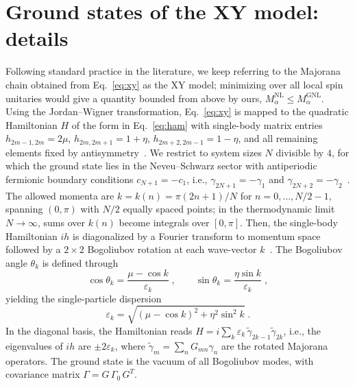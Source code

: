 \documentclass[aps,prl,twocolumn,superscriptaddress,reprint,longbibliography,nofootinbib]{revtex4-2}
\newcommand{\RENYI}{\alpha}
\begin{document}
\section{Ground states of the XY model: details}
\label{app:xy}
Following standard practice in the literature, we keep referring to the Majorana chain obtained from Eq.~\eqref{eq:xy} as the XY model; minimizing over all local spin unitaries would give a quantity bounded from above by ours, $M_\RENYI^{\mathrm{NL}}\le M_\RENYI^{\mathrm{GNL}}$.
Using the Jordan--Wigner transformation, Eq.~\eqref{eq:xy} is mapped to the quadratic Hamiltonian $H$ of the form in Eq.~\eqref{eq:ham} with single-body matrix entries $h_{2m-1,2m} = 2\mu$, $h_{2m,2m+1} = 1+\eta$, $h_{2m+2,2m-1} = 1-\eta$, and all remaining elements fixed by antisymmetry~\cite{Mbeng2024}.
We restrict to system sizes $N$ divisible by $4$, for which the ground state lies in the Neveu--Schwarz sector with antiperiodic fermionic boundary
conditions $c_{N+1}=-c_1$, i.e., $\gamma_{2N+1}=-\gamma_1$ and $\gamma_{2N+2}=-\gamma_2$~\cite{Mbeng2024}.
The allowed momenta are 
$k=k(n)= \pi(2n+1)/N$ for $n = 0,\dots, N/2-1$, 
spanning $(0,\pi)$ with $N/2$ equally spaced points; 
in the thermodynamic limit $N\to\infty$, sums over $k(n)$ 
become integrals over $[0,\pi]$.
Then, the single-body Hamiltonian $ih$ is diagonalized by a Fourier transform to momentum space followed by a $2\times 2$ Bogoliubov rotation at each wave-vector $k$~\cite{Mbeng2024}.
The Bogoliubov angle $\theta_k$ is defined through
\begin{equation}
    \cos\theta_k = \frac{\mu - \cos k}{\varepsilon_k}\;,\qquad \sin\theta_k = \frac{\eta\sin k}{\varepsilon_k}\;,
    \label{eq:bogoliubov_angle}
\end{equation}
yielding the single-particle dispersion
\begin{equation}
    \varepsilon_k = \sqrt{(\mu-\cos k)^2 + \eta^2\sin^2 k}\;.
    \label{eq:dispersion}
\end{equation}
In the diagonal basis, the Hamiltonian reads $H = i\sum_k \varepsilon_k\,\tilde\gamma_{2k-1}\tilde\gamma_{2k}$, i.e., the eigenvalues of $ih$ are $\pm2\varepsilon_k$, where $\tilde\gamma_m = \sum_n G_{mn}\gamma_n$ are the rotated Majorana operators.
The ground state is the vacuum of all Bogoliubov modes, with covariance matrix $\Gamma = G\,\Gamma_0\, G^T$.
\end{document}
